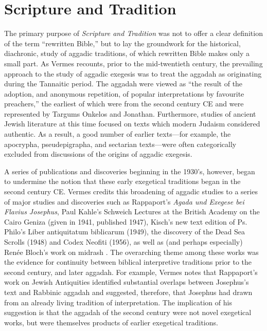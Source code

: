 \section{Scripture and Tradition}\label{scripture-and-tradition}

The primary purpose of \emph{Scripture and Tradition} was not to offer a
clear definition of the term ``rewritten Bible,'' but to lay the
groundwork for the historical, diachronic, study of aggadic traditions,
of which rewritten Bible makes only a small
part.\autocite[3]{vermes_zsengeller2014} As Vermes recounts, prior to
the mid-twentieth century, the prevailing approach to the study of
aggadic exegesis was to treat the aggadah as originating during the
Tannaitic period. The aggadah were viewed as ``the result of the
adoption, and anonymous repetition, of popular interpretations by
favourite preachers,'' \autocite[3]{vermes1961} the earliest of which
were from the second century CE and were represented by Targums Onkelos
and Jonathan. Furthermore, studies of ancient Jewish literature at this
time focused on texts which modern Judaism considered authentic. As a
result, a good number of earlier texts---for example, the apocrypha,
pseudepigrapha, and sectarian texts---were often categorically excluded
from discussions of the origins of aggadic
exegesis.\autocite[2]{vermes1961}

A series of publications and discoveries beginning in the 1930's,
however, began to undermine the notion that these early exegetical
traditions began in the second century CE. Vermes credits this
broadening of aggadic studies to a series of major studies and
discoveries such as Rappaport's \emph{Agada und Exegese bei Flavius
Josephus},\autocite{rappaport1930} Paul Kahle's Schweich Lectures at the
British Academy on the Cairo Geniza (given in 1941, published
1947),\autocite{kahle1947} Kisch's new text edition of Ps. Philo's
Liber antiquitatum biblicarum (1949),\autocite{kisch1949} the discovery
of the Dead Sea Scrolls (1948) and Codex Neofiti (1956), as well as (and
perhaps especially) Renée Bloch's work on midrash
\autocites{bloch1954}{bloch1955_repr}[3--7]{vermes1961}. The overarching
theme among these works was the evidence for continuity between biblical
interpretive traditions prior to the second century, and later aggadah.
For example, Vermes notes that Rappaport's work on Jewish Antiquities
identified substantial overlaps between Josephus's text and Rabbinic
aggadah and suggested, therefore, that Josephus had drawn from an
already living tradition of interpretation. The implication of his
suggestion is that the aggadah of the second century were not novel
exegetical works, but were themselves products of earlier exegetical
traditions.

